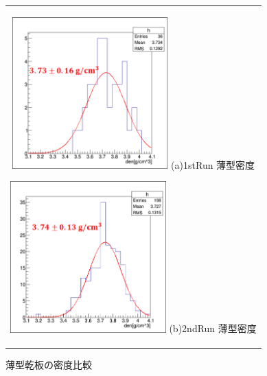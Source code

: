 \documentclass[12pt,a4paper]{jarticle}
\begin{document}
\begin{figure}[htbp]
  \centering
      \begin{tabular}{c}
        \begin{minipage}{0.5\hsize}
          \centering
            \includegraphics[clip, width=60mm]{1stRun_thin_den.png}
            \hspace{1.6cm} (a)1stRun 薄型密度
        \end{minipage}
        
        \begin{minipage}{0.5\hsize}
          \centering
            \includegraphics[clip, width=60mm]{2ndRun_thin_den.png}
            \hspace{1.6cm} (b)2ndRun 薄型密度
        \end{minipage}
    
      \end{tabular}
      \caption{薄型乾板の密度比較\label{fig:compare_thin_den}}
\end{figure}
\newpage
\end{document}
